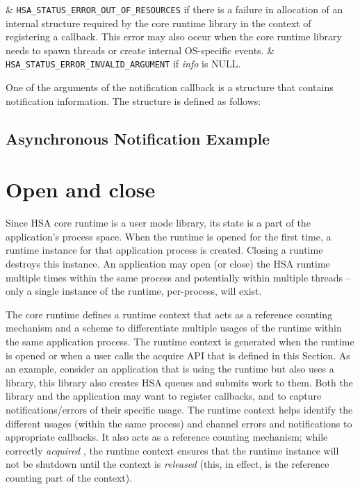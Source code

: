 \documentclass{book}
\newcommand{\diffblock}[1]{#1}
\newcommand{\emphld}[1]{\begin{DIFnomarkup} \emph{#1}
\end{DIFnomarkup}}
\newcommand{\dbtt}[1]{\diffblock{\texttt{#1}}}
\newenvironment{DIFnomarkup}{}{}
\begin{document}
\begin{easylist}
& \dbtt{HSA\_STATUS\_ERROR\_OUT\_OF\_RESOURCES} if there is a failure
in allocation of an internal structure required by the core runtime
library in the context of registering a callback. This error may
also occur when the core runtime library needs to spawn threads or
create internal OS-specific events.
& \dbtt{HSA\_STATUS\_ERROR\_INVALID\_ARGUMENT}
if {\itshape info} is NULL.
\end{easylist}

One of the arguments of the notification callback is a structure
that contains notification information. The structure is defined as
follows:


\subsection{Asynchronous Notification Example}


\hypertarget{init}{}\section{Open and close}\label{init}

Since HSA core runtime is a user mode library, its state is a part
of the application's process space. When the runtime is opened for
the first time, a runtime instance for that application process is
created. Closing a runtime destroys this instance. An application
may open (or close) the HSA runtime multiple times within the same
process and potentially within multiple threads -- only a
single instance of the runtime, per-process, will exist.

The core runtime defines a runtime context that acts as a reference
counting mechanism and a scheme to differentiate multiple usages of
the runtime within the same application process. The runtime context
is generated when the runtime is opened or when a
user calls the acquire API that is defined in this Section. As an
example, consider an application that is using the runtime but also
uses a library, this library also creates HSA queues and submits
work to them. Both the library and the application may want to register
callbacks, and to capture notifications/errors of their specific
usage. The runtime context helps identify the different usages (within
the same process) and channel errors and notifications to
appropriate callbacks. It also acts as a reference counting
mechanism; while correctly \emphld{acquired}, the runtime context
ensures that the runtime instance will not be shutdown until the
context is \emphld{released} (this, in effect, is the reference
counting part of the context).
\end{document}
